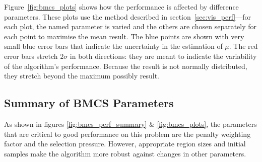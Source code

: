 \documentclass[10pt]{article}
\begin{document}
Figure~\ref{fig:bmcs_plots} shows how the performance is affected by
difference parameters. These plots use the method described in
section~\ref{sec:vis_perf}---for each plot, the named parameter is varied and
the others are chosen separately for each point to maximise the mean result.
The blue points are shown with very small blue error bars that indicate the
uncertainty in the estimation of $\mu$. The red error bars stretch $2 \sigma$
in both directions: they are meant to indicate the variability of the
algorithm's performance. Because the result is not normally distributed,
they stretch beyond the maximum possibly result.

\subsection{Summary of BMCS Parameters}
\label{sec:bmcs_summary}

As shown in figures \ref{fig:bmcs_perf_summary} \& \ref{fig:bmcs_plots}, the
parameters that are critical to good performance on this problem are the
penalty weighting factor and the selection pressure. However, appropriate
region sizes and initial samples make the algorithm more robust against
changes in other parameters.
\end{document}
